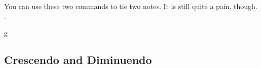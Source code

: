 \documentclass[11pt,a4paper]{ltxdoc}
\begin{document}
You can use these two commands to tie two notes. It is still quite a pain, though. 
.
\begin{dispExample}
\begin{tmsinglestaff}
  \begin{tmstaff}{g}
  \end{tmstaff}
\end{tmsinglestaff}
\end{dispExample}
\subsection{Crescendo and Diminuendo}\label{sec:line:cresc-dim}
\end{document}
